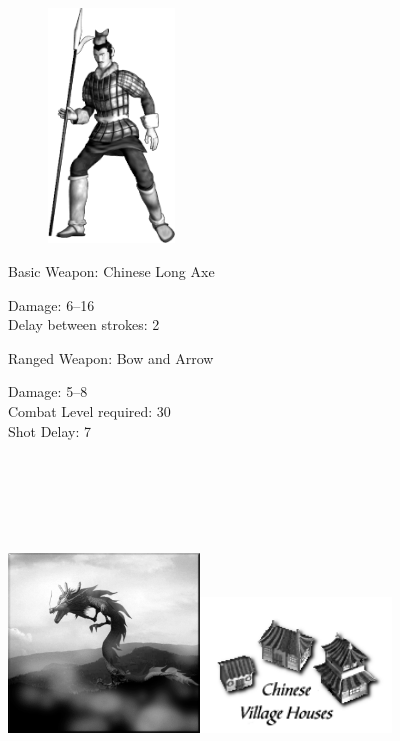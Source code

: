 \begin{figure}
	\begin{center}
		\vspace{-20pt}
		\includegraphics[width=0.3\textwidth]{Achinese}
	\end{center}
	\vspace{-20pt}
\end{figure}

Basic Weapon: Chinese Long Axe
\begin{changemargin}{.5cm}{0cm}
	Damage: 6–16 \\
	Delay between strokes: 2
\end{changemargin}
Ranged Weapon: Bow and Arrow
\begin{changemargin}{.5cm}{0cm}
	Damage: 5–8 \\
	Combat Level required: 30 \\
	Shot Delay: 7 \\ \\ \\ \\ \\ \\
\end{changemargin}

\begin{center}
\includegraphics[width=2in]{Ajingnung}\hspace{1pt}\includegraphics[width=2in]{Ichinesehouse}
\end{center}

